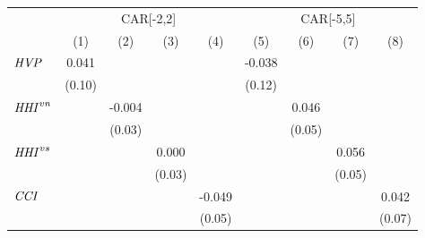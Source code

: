 {
\def\sym#1{\ifmmode^{#1}\else\(^{#1}\)\fi}
\begin{tabular}{l*{8}{c}}
\toprule
                    &\multicolumn{4}{c}{CAR[-2,2]}                                                          &\multicolumn{4}{c}{CAR[-5,5]}                                                          \\\cmidrule(lr){2-5}\cmidrule(lr){6-9}
                    &\multicolumn{1}{c}{(1)}         &\multicolumn{1}{c}{(2)}         &\multicolumn{1}{c}{(3)}         &\multicolumn{1}{c}{(4)}         &\multicolumn{1}{c}{(5)}         &\multicolumn{1}{c}{(6)}         &\multicolumn{1}{c}{(7)}         &\multicolumn{1}{c}{(8)}         \\
\midrule
${\it HVP}$         &       0.041         &                     &                     &                     &      -0.038         &                     &                     &                     \\
                    &      (0.10)         &                     &                     &                     &      (0.12)         &                     &                     &                     \\
${\it HHI}^{vn}$    &                     &      -0.004         &                     &                     &                     &       0.046         &                     &                     \\
                    &                     &      (0.03)         &                     &                     &                     &      (0.05)         &                     &                     \\
${\it HHI}^{vs}$    &                     &                     &       0.000         &                     &                     &                     &       0.056         &                     \\
                    &                     &                     &      (0.03)         &                     &                     &                     &      (0.05)         &                     \\
${\it CCI}$         &                     &                     &                     &      -0.049         &                     &                     &                     &       0.042         \\
                    &                     &                     &                     &      (0.05)         &                     &                     &                     &      (0.07)         \\

\end{tabular}}
